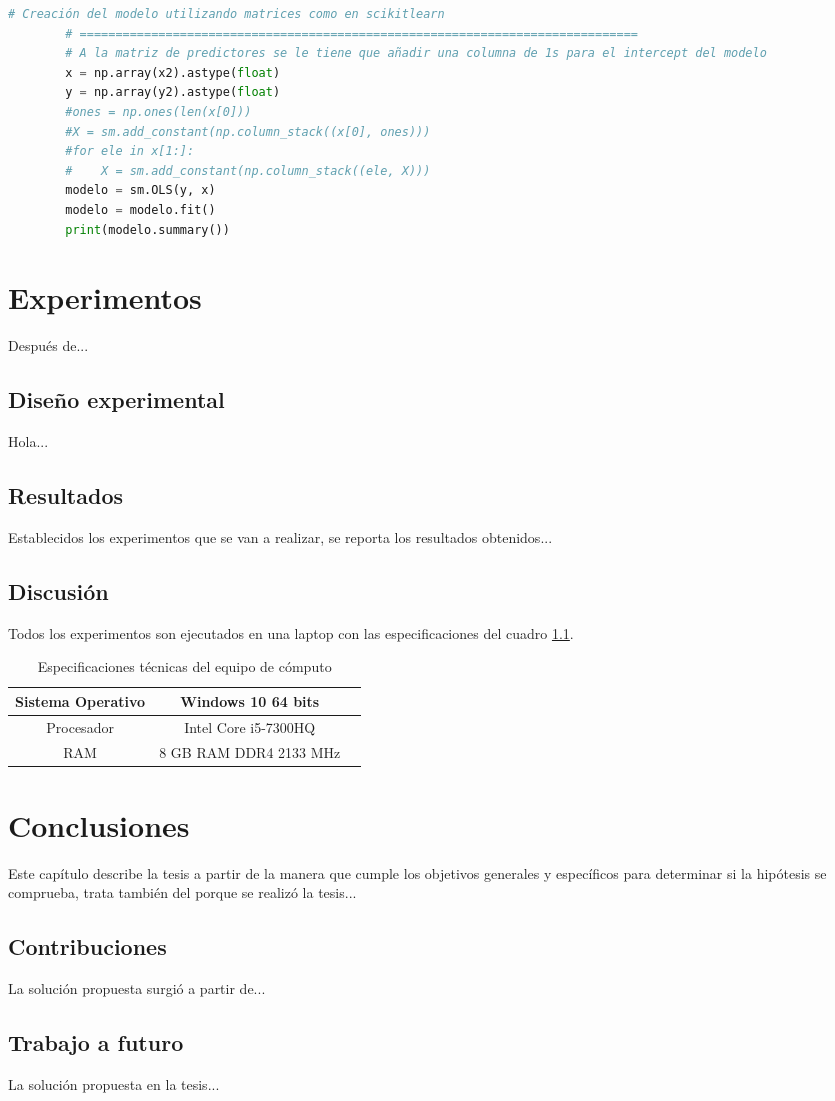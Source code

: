\begin{lstlisting}[language=Python, caption=Procedimiento del segundo paso, label=lst:c4]
        # Creación del modelo utilizando matrices como en scikitlearn
        # ==============================================================================
        # A la matriz de predictores se le tiene que añadir una columna de 1s para el intercept del modelo
        x = np.array(x2).astype(float)
        y = np.array(y2).astype(float)
        #ones = np.ones(len(x[0]))
        #X = sm.add_constant(np.column_stack((x[0], ones)))
        #for ele in x[1:]:
        #    X = sm.add_constant(np.column_stack((ele, X)))
        modelo = sm.OLS(y, x)
        modelo = modelo.fit()
        print(modelo.summary())
\end{lstlisting}

\chapter{Experimentos}
Después de...

\section{Diseño experimental}
Hola...

\section{Resultados}
Establecidos los experimentos que se van a realizar, se reporta los resultados obtenidos...

\section{Discusión}
Todos los experimentos son ejecutados en una laptop con las especificaciones del cuadro \ref{tab:Especificaciones técnicas del PC}.

\begin{table}[H]
	{\centering
		\caption{Especificaciones técnicas del equipo de cómputo}
		\begin{tabular}{|c|c|c|}
			\hline
			Sistema Operativo & Windows 10 64 bits\\
			\hline
			Procesador & Intel Core i5-7300HQ\\
			\hline
			RAM & 8 GB RAM DDR4 2133 MHz\\
			\hline
		\end{tabular}

	\label{tab:Especificaciones técnicas del PC}
	}
\end{table}


\chapter{Conclusiones}
Este capítulo describe la tesis a partir de la manera que cumple los objetivos generales y específicos para determinar si la hipótesis se comprueba, trata también del porque se realizó la tesis...

\clearpage

\section{Contribuciones}
La solución propuesta surgió a partir de...

\section{Trabajo a futuro}
La solución propuesta en la tesis...